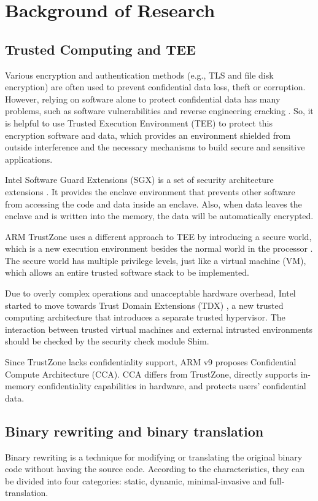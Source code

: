 \section{Background of Research}
\subsection{Trusted Computing and TEE}
Various encryption and authentication methods (e.g., TLS and file disk encryption)
are often used to prevent confidential data loss, theft or corruption.
However, relying on software alone to protect confidential data has many problems,
such as software vulnerabilities and reverse engineering cracking \cite{Zimba2021ARC}.
So, it is helpful to use Trusted Execution Environment (TEE) to protect this encryption
software and data, which provides an environment shielded from outside interference and
the necessary mechanisms to build secure and sensitive applications.

Intel Software Guard Extensions (SGX) is a set of security architecture extensions
\cite{McKeen2013InnovativeIA}.
It provides the enclave environment that prevents other software from accessing
the code and data inside an enclave. Also, when data leaves the enclave and is written
into the memory, the data will be automatically encrypted.

ARM TrustZone uses a different approach to TEE by introducing a secure world,
which is a new execution environment besides the normal world in the processor
\cite{Mukhtar2019ArchitecturesFS}. The secure world has multiple privilege levels,
just like a virtual machine (VM), which allows an entire trusted software stack to
be implemented.

Due to overly complex operations and unacceptable hardware overhead, Intel started to move
towards Trust Domain Extensions (TDX) \cite{Sahita2021SecurityAO, Sardar2021DemystifyingAI},
a new trusted computing architecture that introduces a separate trusted hypervisor. The interaction
between trusted virtual machines and external intrusted environments should be checked by the
security check module Shim.

Since TrustZone lacks confidentiality support, ARM v9 proposes Confidential Compute Architecture (CCA).
CCA \cite{CCA} differs from TrustZone, directly supports in-memory confidentiality capabilities in hardware,
and protects users' confidential data.

\subsection{Binary rewriting and binary translation}
Binary rewriting is a technique for modifying or translating the original binary code
without having the source code. According to the characteristics, they can be divided
into four categories: static, dynamic, minimal-invasive and full-translation.


